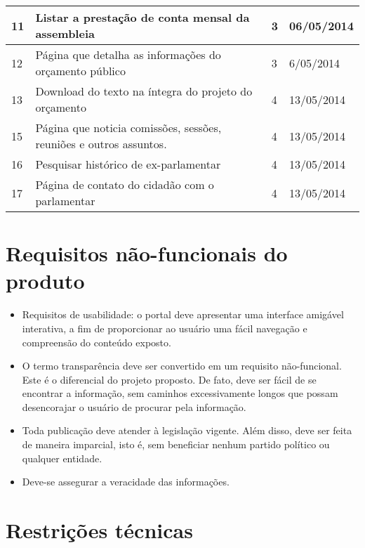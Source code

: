 \documentclass[12pt, a4paper]{article}
\begin{document}
\begin{longtabu}{X[-1, r] | X | X[-1, r] | X[-1]}
            11 &
            Listar a prestação de conta mensal da assembleia &
            3 & 06/05/2014
            \\ \hline

            12 &
            Página que detalha as informações do orçamento público &
            3 & 6/05/2014
            \\ \hline

            13 &
            Download do texto na íntegra do projeto do orçamento &
            4 & 13/05/2014
            \\ \hline

            15 &
            Página que noticia comissões, sessões, reuniões e outros assuntos.
            &
            4 & 13/05/2014
            \\ \hline

            16 &
            Pesquisar histórico de ex-parlamentar &
            4 & 13/05/2014
            \\ \hline

            17 &
            Página de contato do cidadão com o parlamentar &
            4 & 13/05/2014
            \\ \hline
        \end{longtabu}

    \section{Requisitos não-funcionais do produto}
    \begin{itemize}
        \item
        Requisitos de usabilidade: o portal deve apresentar uma interface
        amigável interativa, a fim de proporcionar ao usuário uma fácil
        navegação e compreensão do conteúdo exposto.
        \item
        O termo transparência deve ser convertido em um requisito
        não-funcional. Este é o diferencial do projeto proposto. De fato, deve
        ser fácil de se encontrar a informação, sem caminhos excessivamente
        longos que possam desencorajar o usuário de procurar pela informação.
        \item
        Toda publicação deve atender à legislação vigente. Além disso, deve ser
        feita de maneira imparcial, isto é, sem beneficiar nenhum partido
        político ou qualquer entidade.
        \item
        Deve-se assegurar a veracidade das informações.
    \end{itemize}

    \section{\color{red} Restrições técnicas}
\end{document}
